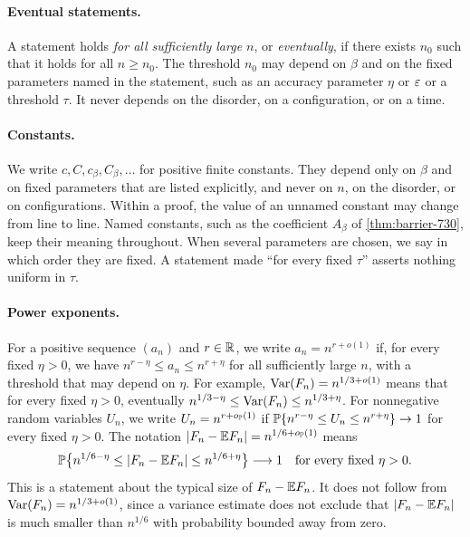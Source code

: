 \paragraph{Eventual statements.} A statement holds \emph{for all sufficiently large $n$}, or \emph{eventually}, if there exists $n_0$ such that it holds for all $n\ge n_0$. The threshold $n_0$ may depend on $\beta$ and on the fixed parameters named in the statement, such as an accuracy parameter $\eta$ or $\varepsilon$ or a threshold $\tau$. It never depends on the disorder, on a configuration, or on a time.

\paragraph{Constants.} We write $c,C,c_\beta,C_\beta,\dots$ for positive finite constants. They depend only on $\beta$ and on fixed parameters that are listed explicitly, and never on $n$, on the disorder, or on configurations. Within a proof, the value of an unnamed constant may change from line to line. Named constants, such as the coefficient $A_\beta$ of \cref{thm:barrier-730}, keep their meaning throughout. When several parameters are chosen, we say in which order they are fixed. A statement made ``for every fixed $\tau$'' asserts nothing uniform in $\tau$.

\paragraph{Power exponents.} For a positive sequence $(a_n)$ and $r\in\mathbb R$, we write $a_n=n^{r+o(1)}$ if, for every fixed $\eta>0$, we have $n^{r-\eta}\le a_n\le n^{r+\eta}$ for all sufficiently large $n$, with a threshold that may depend on $\eta$. For example, $\operatorname{Var}(F_n)=n^{1/3+o(1)}$ means that for every fixed $\eta>0$, eventually $n^{1/3-\eta}\le\operatorname{Var}(F_n)\le n^{1/3+\eta}$.
For nonnegative random variables $U_n$, we write $U_n=n^{r+o_\mathbb P(1)}$ if $\mathbb P\{n^{r-\eta}\le U_n\le n^{r+\eta}\}\to1$ for every fixed $\eta>0$. The notation $|F_n-\mathbb E F_n|=n^{1/6+o_\mathbb P(1)}$ means
\begin{equation}\label{eq:common-fluctuation-window}
 \mathbb P\bigl\{n^{1/6-\eta}\le|F_n-\mathbb E F_n|\le n^{1/6+\eta}\bigr\}\longrightarrow1\quad\text{for every fixed }\eta>0.
\end{equation}
This is a statement about the typical size of $F_n-\mathbb E F_n$. It does not follow from $\operatorname{Var}(F_n)=n^{1/3+o(1)}$, since a variance estimate does not exclude that $|F_n-\mathbb E F_n|$ is much smaller than $n^{1/6}$ with probability bounded away from zero.

